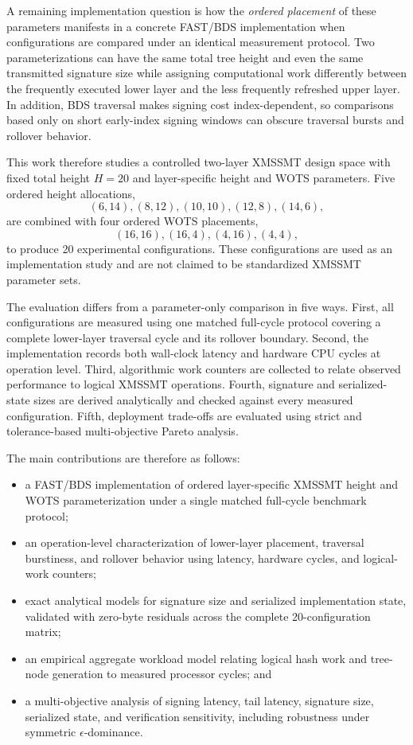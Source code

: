 \documentclass[pdflatex,sn-mathphys-num]{sn-jnl}
\begin{document}
A remaining implementation question is how the \emph{ordered placement}
of these parameters manifests in a concrete FAST/BDS implementation
when configurations are compared under an identical measurement
protocol. Two parameterizations can have the same total tree height and
even the same transmitted signature size while assigning computational
work differently between the frequently executed lower layer and the
less frequently refreshed upper layer. In addition, BDS traversal makes
signing cost index-dependent, so comparisons based only on short
early-index signing windows can obscure traversal bursts and rollover
behavior.

This work therefore studies a controlled two-layer XMSSMT design space
with fixed total height $H=20$ and layer-specific height and WOTS
parameters. Five ordered height allocations,
\[
(6,14),(8,12),(10,10),(12,8),(14,6),
\]
are combined with four ordered WOTS placements,
\[
(16,16),(16,4),(4,16),(4,4),
\]
to produce 20 experimental configurations. These configurations are
used as an implementation study and are not claimed to be standardized
XMSSMT parameter sets.

The evaluation differs from a parameter-only comparison in five ways.
First, all configurations are measured using one matched full-cycle
protocol covering a complete lower-layer traversal cycle and its
rollover boundary. Second, the implementation records both wall-clock
latency and hardware CPU cycles at operation level. Third, algorithmic
work counters are collected to relate observed performance to logical
XMSSMT operations. Fourth, signature and serialized-state sizes are
derived analytically and checked against every measured configuration.
Fifth, deployment trade-offs are evaluated using strict and
tolerance-based multi-objective Pareto analysis.

The main contributions are therefore as follows:
\begin{itemize}
    \item a FAST/BDS implementation of ordered layer-specific XMSSMT
    height and WOTS parameterization under a single matched
    full-cycle benchmark protocol;

    \item an operation-level characterization of lower-layer placement,
    traversal burstiness, and rollover behavior using latency, hardware
    cycles, and logical-work counters;

    \item exact analytical models for signature size and serialized
    implementation state, validated with zero-byte residuals across the
    complete 20-configuration matrix;

    \item an empirical aggregate workload model relating logical hash
    work and tree-node generation to measured processor cycles; and

    \item a multi-objective analysis of signing latency, tail latency,
    signature size, serialized state, and verification sensitivity,
    including robustness under symmetric $\epsilon$-dominance.
\end{itemize}
\end{document}
